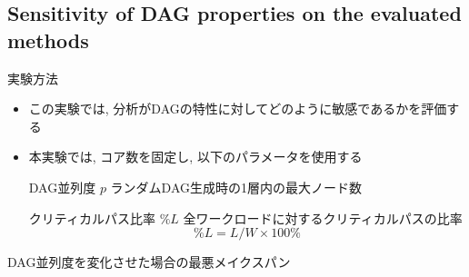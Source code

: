 

\subsection{Sensitivity of DAG properties on the evaluated methods}
\label{ssec: Sensitivity of DAG properties on the evaluated methods}

\begin{frame}{実験方法}
    \begin{itemize}
        \item この実験では, 分析がDAGの特性に対してどのように敏感であるかを評価する
        \item 本実験では, コア数を固定し, 以下のパラメータを使用する
              \begin{block}{DAG並列度 $p$}
                  ランダムDAG生成時の1層内の最大ノード数
              \end{block}
              \begin{block}{クリティカルパス比率 $\% L$}
                  全ワークロードに対するクリティカルパスの比率
                  \[
                      \% L=L / W \times 100 \%
                  \]
              \end{block}
    \end{itemize}
\end{frame}

\begin{frame}{DAG並列度を変化させた場合の最悪メイクスパン}
\end{frame}

